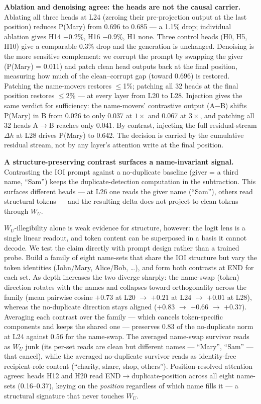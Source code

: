 \documentclass[11pt]{article}
\newcommand{\dhh}{\Delta h}
\newcommand{\WU}{W_U}
\begin{document}
\textbf{Ablation and denoising agree: the heads are not the causal carrier.}
Ablating all three heads at L24 (zeroing their pre-projection output at the last
position) reduces P(Mary) from 0.696 to 0.685 --- a 1.1\% drop; individual
ablation gives H14 $-0.2$\%, H16 $-0.9$\%, H1 none. Three control heads (H0, H5, H10)
give a comparable 0.3\% drop and the generation is unchanged. Denoising is the
more sensitive complement: we corrupt the prompt by swapping the giver
(P(Mary) = 0.011) and patch clean head outputs back at the final position,
measuring how much of the clean--corrupt gap (toward 0.696) is restored.
Patching the name-movers restores $\le$1\%; patching all 32 heads at the final
position restores $\le$2\% --- at every layer from L20 to L28. Injection gives the
same verdict for sufficiency: the name-movers' contrastive output (A$-$B)
shifts P(Mary) in B from 0.026 to only 0.037 at $1\times$ and 0.067 at $3\times$, and
patching all 32 heads A$\rightarrow$B reaches only 0.041. By contrast, injecting the full
residual-stream $\dhh$ at L28 drives P(Mary) to 0.642. The decision is carried by
the cumulative residual stream, not by any layer's attention write at the
final position.

\textbf{A structure-preserving contrast surfaces a name-invariant signal.} Contrasting
the IOI prompt against a no-duplicate baseline (giver = a third name, ``Sam'')
keeps the duplicate-detection computation in the subtraction. This surfaces
different heads --- at L26 one reads the giver name (``Sam''), others read
structural tokens --- and the resulting delta does not project to clean tokens
through $\WU$.

$\WU$-illegibility alone is weak evidence for structure, however: the logit lens
is a single linear readout, and token content can be superposed in a basis it
cannot decode. We test the claim directly with prompt design rather than a
trained probe. Build a family of eight name-sets that share the IOI structure
but vary the token identities (John/Mary, Alice/Bob, \ldots), and form both contrasts
at END for each set. As depth increases the two diverge sharply: the name-swap
(token) direction rotates with the names and collapses toward orthogonality
across the family (mean pairwise cosine $+0.73$ at L20 $\rightarrow$ $+0.21$ at L24 $\rightarrow$ $+0.01$ at
L28), whereas the no-duplicate direction stays aligned ($+0.83$ $\rightarrow$ $+0.66$ $\rightarrow$ $+0.37$).
Averaging each contrast over the family --- which cancels token-specific
components and keeps the shared one --- preserves 0.83 of the no-duplicate norm at
L24 against 0.56 for the name-swap. The averaged name-swap survivor reads as
$\WU$ junk (its per-set reads are clean but different names --- ``Mary'', ``Sam'' --- that
cancel), while the averaged no-duplicate survivor reads as identity-free
recipient-role content (``charity, share, shop, others''). Position-resolved
attention agrees: heads H12 and H20 read END$\rightarrow$duplicate-position across all eight
name-sets (0.16--0.37), keying on the \emph{position} regardless of which name fills
it --- a structural signature that never touches $\WU$.
\end{document}
